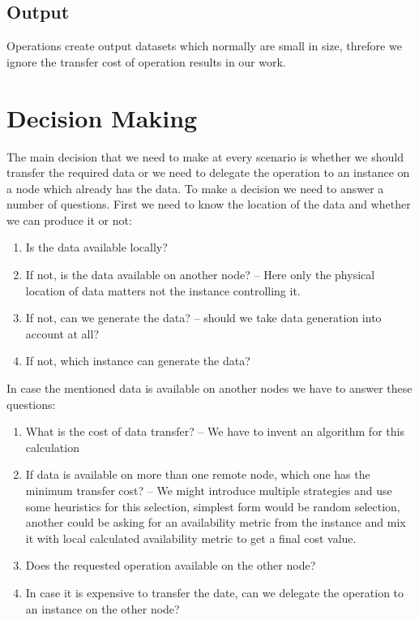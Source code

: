 \subsection{Output}
Operations create output datasets which normally are small in size, threfore we ignore the transfer cost of operation
results in our work.


\section{Decision Making}
The main decision that we need to make at every scenario is whether we should transfer the required data or we
need to delegate the operation to an instance on a node which already has the data. To make a decision we need to
answer a number of questions. First we need to know the location of the data and whether we can produce it or not:

\begin{enumerate}
\item Is the data available locally?
\item If not, is the data available on another node? -- Here only the physical location of data matters not the instance
controlling it.
\item If not, can we generate the data? -- should we take data generation into account at all?
\item If not, which instance can generate the data?
\end{enumerate}


In case the mentioned data is available on another nodes we have to answer these questions:
\begin{enumerate}
\item What is the cost of data transfer? -- We have to invent an algorithm for this calculation
\item If data is available on more than one remote node, which one has the minimum transfer cost? -- We might
introduce multiple strategies and use some heuristics for this selection, simplest form would be random selection,
another could be asking for an availability metric from the instance and mix it with local calculated availability 
metric to get a final cost value.
\item Does the requested operation available on the other node?
\item In case it is expensive to transfer the date, can we delegate the operation to an instance on the other node?
\end{enumerate}

